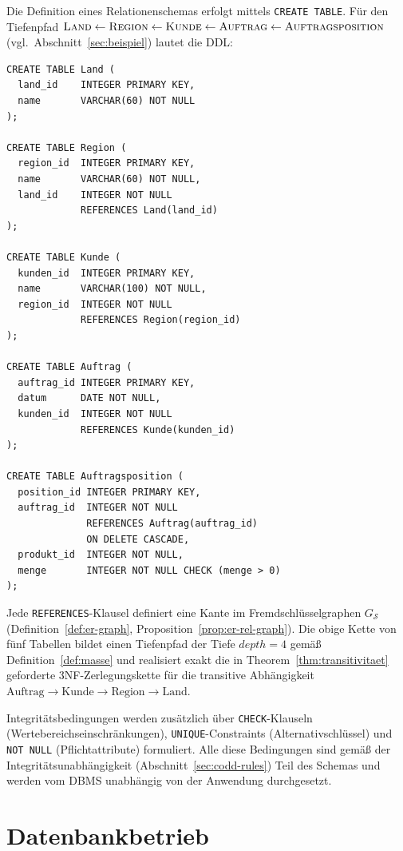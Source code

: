 ﻿\documentclass[a4paper,12pt]{report}
\theoremstyle{definition}
\theoremstyle{remark}
\newcommand{\depth}{\mathit{depth}}
\begin{document}
\label{sec:ddl}

Die Definition eines Relationenschemas erfolgt mittels \texttt{CREATE
TABLE}. Für den Tiefenpfad
$\textsc{Land} \leftarrow \textsc{Region} \leftarrow \textsc{Kunde}
\leftarrow \textsc{Auftrag} \leftarrow \textsc{Auftragsposition}$
(vgl.\ Abschnitt~\ref{sec:beispiel}) lautet die DDL:

\begin{lstlisting}
CREATE TABLE Land (
  land_id    INTEGER PRIMARY KEY,
  name       VARCHAR(60) NOT NULL
);

CREATE TABLE Region (
  region_id  INTEGER PRIMARY KEY,
  name       VARCHAR(60) NOT NULL,
  land_id    INTEGER NOT NULL
             REFERENCES Land(land_id)
);

CREATE TABLE Kunde (
  kunden_id  INTEGER PRIMARY KEY,
  name       VARCHAR(100) NOT NULL,
  region_id  INTEGER NOT NULL
             REFERENCES Region(region_id)
);

CREATE TABLE Auftrag (
  auftrag_id INTEGER PRIMARY KEY,
  datum      DATE NOT NULL,
  kunden_id  INTEGER NOT NULL
             REFERENCES Kunde(kunden_id)
);

CREATE TABLE Auftragsposition (
  position_id INTEGER PRIMARY KEY,
  auftrag_id  INTEGER NOT NULL
              REFERENCES Auftrag(auftrag_id)
              ON DELETE CASCADE,
  produkt_id  INTEGER NOT NULL,
  menge       INTEGER NOT NULL CHECK (menge > 0)
);
\end{lstlisting}

Jede \texttt{REFERENCES}-Klausel definiert eine Kante im
Fremdschlüsselgraphen $G_{\mathcal{S}}$ (Definition~\ref{def:er-graph},
Proposition~\ref{prop:er-rel-graph}). Die obige Kette von fünf
Tabellen bildet einen Tiefenpfad der Tiefe $\depth=4$ gemäß
Definition~\ref{def:masse} und realisiert exakt die in
Theorem~\ref{thm:transitivitaet} geforderte 3NF-Zerlegungskette für die
transitive Abhängigkeit $\text{Auftrag} \to \text{Kunde} \to
\text{Region} \to \text{Land}$.

Integritätsbedingungen werden zusätzlich über \texttt{CHECK}-Klauseln
(Wertebereichseinschränkungen), \texttt{UNIQUE}-Constraints
(Alternativschlüssel) und \texttt{NOT NULL} (Pflichtattribute)
formuliert. Alle diese Bedingungen sind gemäß der
Integritätsunabhängigkeit (Abschnitt~\ref{sec:codd-rules}) Teil des
Schemas und werden vom DBMS unabhängig von der Anwendung durchgesetzt.

\chapter{Datenbankbetrieb}
\label{ch:betrieb}
\end{document}

